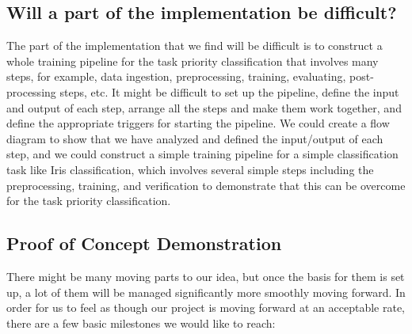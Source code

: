 \documentclass{article}
\begin{document}
    \subsection*{Will a part of the implementation be difficult?} 
    The part of the implementation that we find will be difficult is to construct a whole training pipeline for the task priority classification that involves many steps, for example, data ingestion, preprocessing, training, evaluating, post-processing steps, etc. It might be difficult to set up the pipeline, define the input and output of each step, arrange all the steps and make them work together, and define the appropriate triggers for starting the pipeline. We could create a flow diagram to show that we have analyzed and defined the input/output of each step, and we could construct a simple training pipeline for a simple classification task like Iris classification, which involves several simple steps including the preprocessing, training, and verification to demonstrate that this can be overcome for the task priority classification.

    \subsection*{Proof of Concept Demonstration}
    There might be many moving parts to our idea, but once the basis for them is set up, a lot of them will be managed significantly more smoothly moving forward. In order for us to feel as though our project is moving forward at an acceptable rate, there are a few basic milestones we would like to reach:
\end{document}
